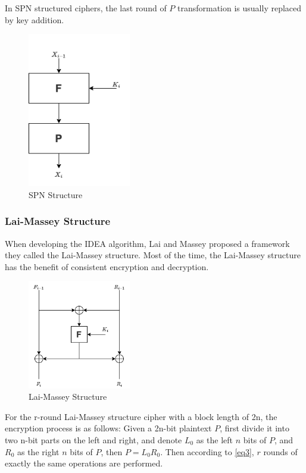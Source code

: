 In SPN structured ciphers, the last round of $P$ transformation is usually replaced by key addition.

\begin{figure}[hbt!]
    \centering
    \includegraphics[width=45mm]{SPN}
    \caption[Boomerang Attack Model]{SPN Structure}\label{fig:SPN}
\end{figure}

\subsubsection{Lai-Massey Structure}
When developing the IDEA algorithm, Lai and Massey proposed a framework they called the Lai-Massey structure. Most of the time, the Lai-Massey structure has the benefit of consistent encryption and decryption.

\begin{figure}[hbt!]
    \centering
    \includegraphics[width=45mm]{Lai_Massey.png}
    \caption[Boomerang Attack Model]{Lai-Massey Structure}\label{fig:Lai_Massey}
\end{figure}

For the r-round Lai-Massey structure cipher with a block length of 2n, the encryption process is as follows: Given a 2n-bit plaintext $P$, first divide it into two n-bit parts on the left and right, and denote $L_0$ as the left $n$ bits of $P$, and $R_0$ as the right $n$ bits of $P$, then $P=L_0R_0$. Then according to \eqref{eq3}, $r$ rounds of exactly the same operations are performed.

